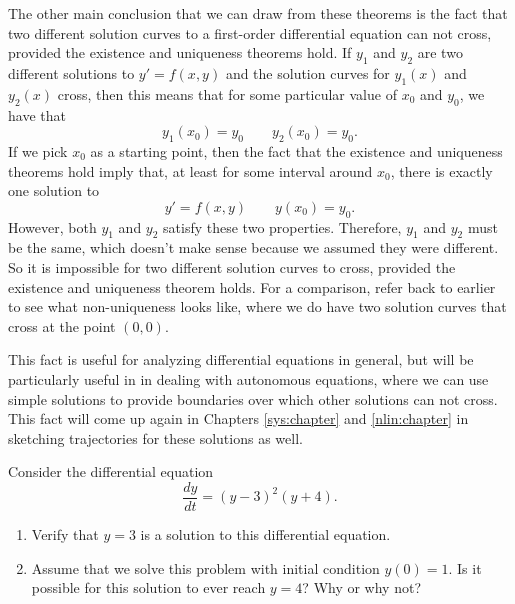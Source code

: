\documentclass{ximera}
\begin{document}
The other main conclusion that we can draw from these theorems is the fact that two different solution curves to a first-order differential equation can not cross, provided the existence and uniqueness theorems hold. If $y_1$ and $y_2$ are two different solutions to $y' = f(x,y)$ and the solution curves for $y_1(x)$ and $y_2(x)$ cross, then this means that for some particular value of $x_0$ and $y_0$, we have that
\begin{equation*}
    y_1(x_0) = y_0 \qquad y_2(x_0) = y_0.
\end{equation*}
If we pick $x_0$ as a starting point, then the fact that the existence and uniqueness theorems hold imply that, at least for some interval around $x_0$, there is exactly one solution to 
\begin{equation*}
    y' = f(x,y) \qquad y(x_0) = y_0.
\end{equation*} 
However, both $y_1$ and $y_2$ satisfy these two properties. Therefore, $y_1$ and $y_2$ must be the same, which doesn't make sense because we assumed they were different. So it is impossible for two different solution curves to cross, provided the existence and uniqueness theorem holds. For a comparison, refer back to  earlier to see what non-uniqueness looks like, where we do have two solution curves that cross at the point $(0,0)$.

This fact is useful for analyzing differential equations in general, but will be particularly useful in  in dealing with autonomous equations, where we can use simple solutions to provide boundaries over which other solutions can not cross. This fact will come up again in Chapters \ref{sys:chapter} and \ref{nlin:chapter} in sketching trajectories for these solutions as well. 

\begin{example}
    Consider the differential equation 
    \begin{equation*}
        \frac{dy}{dt} = (y-3)^2(y+4).
    \end{equation*}
    \begin{enumerate}
        \item Verify that $y=3$ is a solution to this differential equation.
        \item Assume that we solve this problem with initial condition $y(0) = 1$. Is it possible for this solution to ever reach $y=4$? Why or why not?
    \end{enumerate}
\end{example}
\end{document}
